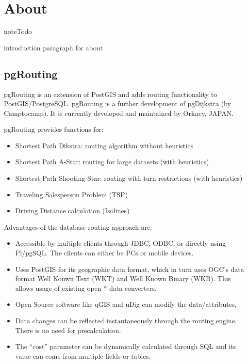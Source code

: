 \documentclass[a4paper,10pt,english]{manual}
\begin{document}
\resetcurrentobjects
\hypertarget{--doc-chapters/about}{}

\chapter{About}
\hypertarget{todo-27}{}
\begin{notice}{note}{Todo}

introduction paragraph for about
\end{notice}


\section{pgRouting}

pgRouting is an extension of PostGIS and adds routing functionality to PostGIS/PostgreSQL. pgRouting is a further development of pgDijkstra (by Camptocamp). It is currently developed and maintained by Orkney, JAPAN.

pgRouting provides functions for:
\begin{itemize}
\item {} 
Shortest Path Dikstra: routing algorithm without heuristics

\item {} 
Shortest Path A-Star: routing for large datasets (with heuristics)

\item {} 
Shortest Path Shooting-Star: routing with turn restrictions (with heuristics)

\item {} 
Traveling Salesperson Problem (TSP)

\item {} 
Driving Distance calculation (Isolines)

\end{itemize}

Advantages of the database routing approach are:
\begin{itemize}
\item {} 
Accessible by multiple clients through JDBC, ODBC, or directly using Pl/pgSQL. The clients can either be PCs or mobile devices.

\item {} 
Uses PostGIS for its geographic data format, which in turn uses OGC's data format Well Konwn Text (WKT) and Well Known Binary (WKB). This allows usage of existing open * data converters.

\item {} 
Open Source software like qGIS and uDig can modify the data/attributes,

\item {} 
Data changes can be reflected instantaneously through the routing engine. There is no need for precalculation.

\item {} 
The ``cost'' parameter can be dynamically calculated through SQL and its value can come from multiple fields or tables.

\end{itemize}
\end{document}
